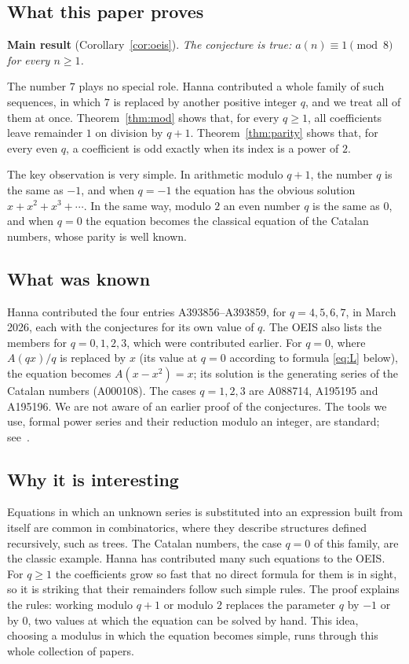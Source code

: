 \documentclass[11pt,a4paper]{article}
\theoremstyle{definition}
\theoremstyle{remark}
\begin{document}
\subsection{What this paper proves}
\textbf{Main result} (Corollary~\ref{cor:oeis}). \emph{The conjecture is true: $a(n)\equiv1\pmod{8}$ for every $n\ge1$.}

The number $7$ plays no special role. Hanna contributed a whole family of such sequences, in which
$7$ is replaced by another positive integer $q$, and we treat all of them at once.
Theorem~\ref{thm:mod} shows that, for every $q\ge1$, all coefficients leave remainder $1$ on division by $q+1$.
Theorem~\ref{thm:parity} shows that, for every even $q$, a coefficient is odd exactly when its index is a power of $2$.

The key observation is very simple. In arithmetic modulo $q+1$, the number $q$ is the same as $-1$, and when $q=-1$ the
equation has the obvious solution $x+x^2+x^3+\cdots$. In the same way, modulo $2$ an even number $q$ is the same as $0$,
and when $q=0$ the equation becomes the classical equation of the Catalan numbers, whose parity is well known.

\subsection{What was known}
Hanna contributed the four entries A393856--A393859, for $q=4,5,6,7$, in March 2026, each with the conjectures for its
own value of $q$. The OEIS also lists the members for $q=0,1,2,3$, which were contributed earlier. For $q=0$, where
$A(qx)/q$ is replaced by $x$ (its value at $q=0$ according to formula \eqref{eq:L} below), the equation becomes
$A(x-x^2)=x$; its solution is the generating series of the Catalan numbers (A000108). The cases $q=1,2,3$ are
A088714, A195195 and A195196. We are not aware of an earlier proof of the conjectures. The tools we use, formal power
series and their reduction modulo an integer, are standard; see~\cite{niven,stanley}.

\subsection{Why it is interesting}
Equations in which an unknown series is substituted into an expression built from itself are common in
combinatorics, where they describe structures defined recursively, such as trees. The Catalan numbers, the case $q=0$
of this family, are the classic example. Hanna has contributed many such equations to the OEIS. For $q\ge1$ the
coefficients grow so fast that no direct formula for them is in sight, so it is striking that their remainders follow
such simple rules. The proof explains the rules: working modulo $q+1$ or modulo $2$ replaces the parameter $q$ by $-1$
or by $0$, two values at which the equation can be solved by hand. This idea, choosing a modulus in which the equation
becomes simple, runs through this whole collection of papers.
\end{document}
